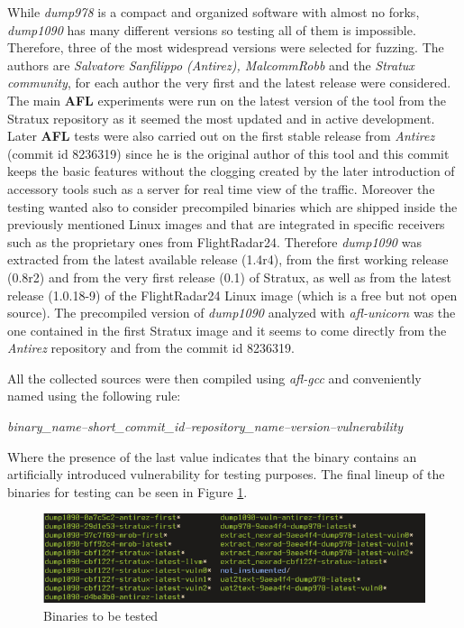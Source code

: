 \documentclass[../main.tex]{subfiles}
\begin{document}
While \textit{dump978} is a compact and organized software with almost no forks,
\textit{dump1090} has many different versions so testing all of them is
impossible. Therefore, three of the most widespread versions were selected for
fuzzing. The authors are \textit{Salvatore Sanfilippo (Antirez), MalcommRobb} and the \textit{Stratux community}, for each author the very first and the latest release were considered. The main \textbf{AFL} experiments were run on the latest version of the tool from the Stratux repository as it seemed the most
updated and in active development. Later \textbf{AFL} tests were also carried
out on the first stable release from \textit{Antirez} (commit id 8236319) since
he is the original author of this tool and this commit keeps the basic features
without the clogging created by the later introduction of accessory tools such
as a server for real time view of the traffic. Moreover the testing wanted also to consider precompiled binaries which are shipped inside the previously
mentioned Linux images and that are integrated in specific receivers such as the
proprietary ones from FlightRadar24. Therefore \textit{dump1090} was extracted
from the latest available release (1.4r4), from the first working release
(0.8r2) and from the very first release (0.1) of Stratux, as well as from the latest release (1.0.18-9) of the FlightRadar24 Linux image (which is a free but not open source). The precompiled version of \textit{dump1090} analyzed with \textit{afl-unicorn} was the one contained in the first Stratux image and it seems to come directly from the \textit{Antirez} repository and from the commit id 8236319.

All the collected sources were then compiled using \textit{afl-gcc} and
conveniently named using the following rule:

\emph{binary\_name--short\_commit\_id--repository\_name--version--vulnerability}

Where the presence of the last value indicates that the binary contains an
artificially introduced vulnerability for testing purposes. The final lineup of
the binaries for testing can be seen in Figure \ref{fig:binline}.

 \begin{figure}[htp]
   \centering
   \includegraphics[scale=0.83]{images/binsetup.png}
   \caption{Binaries to be tested}
   \label{fig:binline}
 \end{figure}
\end{document}
